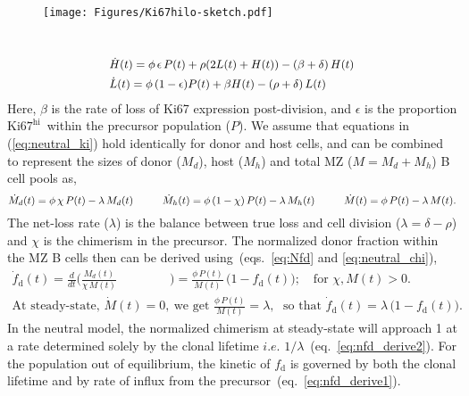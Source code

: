 \documentclass[11pt]{article}
\newcommand{\khi}{\ensuremath{\text{Ki67}^\text{hi}}~}
\newcommand\ie{$\textit{i.e.}$}
\begin{document}
\vspace{-4mm}
\begin{wrapfigure}[7]{l}{0.34\textwidth}
\centering
\texttt{[image: Figures/Ki67hilo-sketch.pdf]}%
\label{fig:ki67_sketch}
\end{wrapfigure}
~
\begin{eqnarray}
\small
\begin{aligned} 
& \dot H(t) = \phi \, \epsilon \, P(t) + \rho (2 L(t) + H(t)) - (\beta + \delta) \, H(t) \\
& \dot L(t) = \phi \, (1-\epsilon) P(t) + \beta H(t) - (\rho + \delta) \, L(t) 
\label{eq:neutral_ki}
\end{aligned}
\end{eqnarray}
Here, $\beta$ is the rate of loss of Ki67 expression post-division, and $\epsilon$ is the proportion \khi within the precursor population ($P$).
We assume that equations in (\ref{eq:neutral_ki}) hold identically for donor and host cells, and can be combined to represent the sizes of donor ($M_{d}$), host ($M_{h}$) and total MZ ($M = M_{d} + M_{h}$) B cell pools as,
{\small
\begin{equation}\small
\dot M_{d}(t) = \phi \, \chi \, P(t) - \lambda \, M_{d}(t) \quad \quad \quad
\dot M_{h}(t) = \phi \, (1-\chi) \, P(t) - \lambda \, M_{h}(t) \quad \quad \quad
\dot M(t) = \phi \, P(t) - \lambda \, M(t).
\label{eq:neutral_chi}
\end{equation}
}%
The net-loss rate ($\lambda$) is the balance between true loss and cell division ($\lambda = \delta - \rho$) and $\chi$ is the chimerism in the precursor.
The normalized donor fraction within the MZ B cells then can be derived using~(eqs.~\ref{eq:Nfd} and \ref{eq:neutral_chi}),
{\small
\begin{align} 
\dot f_\text{d}(t) = \frac{d}{dt} \bigg(\frac{M_{d}(t)}{\chi \, M(t)} & \bigg)  = \frac{\phi \, P(t)}{M(t)} \, \big(1-f_\text{d}(t)\big); \quad \text{for }\chi, M(t) > 0. \label{eq:nfd_derive1} \\  
\text{At steady-state, } \dot M(t) = 0, \; & \text{ we get }  \frac{\phi \, P(t)}{M(t)} = \lambda,  \; \text{ so that }  \dot f_\text{d}(t) = \lambda \, \big(1 - f_\text{d}(t)\big). 
\label{eq:nfd_derive2}
\end{align}
}%
In the neutral model, the normalized chimerism at steady-state will approach 1 at a rate determined solely by the clonal lifetime {\ie} $1/\lambda$~(eq.~\ref{eq:nfd_derive2}). 
For the population out of equilibrium, the kinetic of $f_\text{d}$ is governed by both the clonal lifetime and by rate of influx from the precursor~(eq.~\ref{eq:nfd_derive1}).
\end{document}
